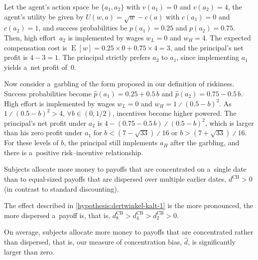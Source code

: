 \begin{example}
	\label{example:budde-kraekel-2}
	Let the agent's action space be $\{a_1, a_2\}$ with ${v(a_1) = 0}$ and
	${v(a_2) = 4}$, the agent's utility be given by ${U(w, a) = \sqrt{w} - c(a)}$ with ${c(a_1) = 0}$ and ${c(a_2) = 1}$, and success probabilities be ${p(a_1) = 0.25}$ and ${p(a_2) = 0.75}$. Then, high effort~$a_2$ is implemented by wages ${w_L = 0}$ and ${w_H = 4}$. The expected compensation cost is ${\operatorname{E}[w] = 0.25 \times 0 + 0.75 \times 4 = 3}$, and the principal's net profit is ${4 - 3 = 1}$. The principal strictly prefers $a_2$ to $a_1$, since implementing $a_1$ yields a~net profit of~$0$. \par
	Now consider a~garbling of the form proposed in our definition of riskiness. Success probabilities become ${\hat{p}(a_1) = 0.25 + 0.5\,b}$ and ${\hat{p}(a_2) = 0.75 - 0.5\,b}$. High effort is implemented by wages ${w_L = 0}$ and ${w_H = 1 \divslash (0.5 - b)^2}$. As ${1 \divslash (0.5 - b)^2 > 4}$, ${\forall b \in (0, 1/2)}$, incentives become higher powered. The principal's net profit under $a_2$ is ${4 - (0.75 - 0.5\,b) \divslash (0.5 - b)^2}$, which is larger than his zero profit under $a_1$ for ${b < (7 - \sqrt{33}) \divslash 16}$ or ${b > (7 + \sqrt{33}) \divslash 16}$. For these levels of $b$, the principal still implements $a_H$ after the garbling, and there is a~positive risk--incentive relationship.
\end{example}

\begin{hypothesis}
	\label{hypothesis:dertwinkel-kalt-1}
	Subjects allocate more money to payoffs that are concentrated on a~single date than to equal-sized payoffs that are dispersed over multiple earlier dates, ${d^{\mathrm{CB}} > 0}$ (in contrast to standard discounting).
\end{hypothesis}

\begin{hypothesis}
	\label{hypothesis:dertwinkel-kalt-2}
	The effect described in \autoref{hypothesis:dertwinkel-kalt-1} is the more pronounced, the more dispersed a~payoff is, that is, ${d^{\mathrm{CB}}_8 > d^{\mathrm{CB}}_4 > d^{\mathrm{CB}}_2 > 0}$.
\end{hypothesis}

\begin{result}
	\label{result:dertwinkel-kalt-1}
	On average, subjects allocate more money to payoffs that are concentrated rather than dispersed, that is, our measure of concentration bias, $\hat{d}$, is significantly larger than zero.
\end{result}

